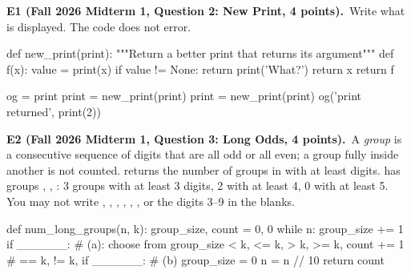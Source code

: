 \documentclass[10pt]{scrartcl}
\begin{document}
\begin{prob}\textbf{E1 (Fall 2026 Midterm 1, Question 2: New Print, 4 points).}\ Write what is displayed. The code does not error.
\begin{py}
def new_print(print):
    """Return a better print that returns its argument"""
    def f(x):
        value = print(x)
        if value != None:
            return print('What?')
        return x
    return f

og = print
print = new_print(print)
print = new_print(print)
og('print returned', print(2))
\end{py}
\end{prob}
\begin{prob}\textbf{E2 (Fall 2026 Midterm 1, Question 3: Long Odds, 4 points).}\ A \emph{group} is a consecutive sequence of digits that are all odd or all even; a group fully inside another is not counted.  returns the number of groups in  with at least  digits.  has groups , , : 3 groups with at least 3 digits, 2 with at least 4, 0 with at least 5. You may not write , , , , \cd{[}, \cd{]}, or the digits 3--9 in the blanks.
\begin{py}
def num_long_groups(n, k):
    group_size, count = 0, 0
    while n:
        group_size += 1
        if ______:          # (a): choose from group_size < k, <= k, > k, >= k,
            count += 1      #      == k, != k, %
        if ______:          # (b)
            group_size = 0
        n = n // 10
    return count
\end{py}
\end{prob}
\end{document}
